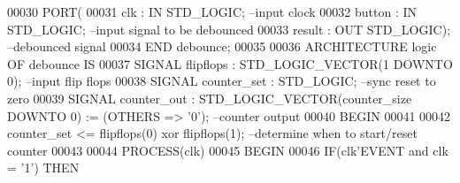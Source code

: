\begin{DoxyCode}
00030   \textcolor{keywordflow}{PORT}\textcolor{vhdlchar}{(}
00031     \textcolor{vhdlchar}{clk}     \textcolor{vhdlchar}{:} \textcolor{keywordflow}{IN}  \textcolor{comment}{STD\_LOGIC};\textcolor{keyword}{  --input clock}
00032     \textcolor{vhdlchar}{button}  \textcolor{vhdlchar}{:} \textcolor{keywordflow}{IN}  \textcolor{comment}{STD\_LOGIC};\textcolor{keyword}{  --input signal to be debounced}
00033     \textcolor{vhdlchar}{result}  \textcolor{vhdlchar}{:} \textcolor{keywordflow}{OUT} \textcolor{comment}{STD\_LOGIC}\textcolor{vhdlchar}{)};\textcolor{keyword}{ --debounced signal}
00034 \textcolor{keywordflow}{END} \textcolor{vhdlchar}{debounce};
00035 
00036 \textcolor{keywordflow}{ARCHITECTURE} logic \textcolor{keywordflow}{OF} debounce IS
00037   \textcolor{keywordflow}{SIGNAL} \textcolor{vhdlchar}{flipflops}   \textcolor{vhdlchar}{:} \textcolor{comment}{STD\_LOGIC\_VECTOR}\textcolor{vhdlchar}{(}\textcolor{vhdllogic}{}\textcolor{vhdllogic}{1} \textcolor{keywordflow}{DOWNTO} \textcolor{vhdllogic}{}\textcolor{vhdllogic}{0}\textcolor{vhdlchar}{)};\textcolor{keyword}{ --input flip flops}
00038   \textcolor{keywordflow}{SIGNAL} \textcolor{vhdlchar}{counter_set} \textcolor{vhdlchar}{:} \textcolor{comment}{STD\_LOGIC};\textcolor{keyword}{                    --sync reset to zero}
00039   \textcolor{keywordflow}{SIGNAL} \textcolor{vhdlchar}{counter_out} \textcolor{vhdlchar}{:} \textcolor{comment}{STD\_LOGIC\_VECTOR}\textcolor{vhdlchar}{(}\textcolor{vhdlchar}{counter_size} \textcolor{keywordflow}{DOWNTO} \textcolor{vhdllogic}{}\textcolor{vhdllogic}{0}\textcolor{vhdlchar}{)} \textcolor{vhdlchar}{:=} \textcolor{vhdlchar}{(}\textcolor{keywordflow}{OTHERS} \textcolor{vhdlchar}{=}\textcolor{vhdlchar}{>} \textcolor{vhdlchar}{'}\textcolor{vhdllogic}{}\textcolor{vhdllogic}{0}\textcolor{vhdlchar}{'}\textcolor{vhdlchar}{)};\textcolor{keyword}{ --counter output}
00040 \textcolor{vhdlkeyword}{BEGIN}
00041 
00042   \textcolor{vhdlchar}{counter_set} \textcolor{vhdlchar}{<=} \textcolor{vhdlchar}{flipflops}\textcolor{vhdlchar}{(}\textcolor{vhdllogic}{}\textcolor{vhdllogic}{0}\textcolor{vhdlchar}{)} \textcolor{keywordflow}{xor} \textcolor{vhdlchar}{flipflops}\textcolor{vhdlchar}{(}\textcolor{vhdllogic}{}\textcolor{vhdllogic}{1}\textcolor{vhdlchar}{)};\textcolor{keyword}{   --determine when to start/reset counter}
00043   
00044   \textcolor{keywordflow}{PROCESS}(clk)
00045 \textcolor{vhdlkeyword}{  BEGIN}
00046     \textcolor{keywordflow}{IF}\textcolor{vhdlchar}{(}\textcolor{vhdlchar}{clk}\textcolor{vhdlchar}{'}\textcolor{vhdlkeyword}{EVENT} \textcolor{keywordflow}{and} \textcolor{vhdlchar}{clk} \textcolor{vhdlchar}{=} \textcolor{vhdlchar}{'}\textcolor{vhdllogic}{}\textcolor{vhdllogic}{1}\textcolor{vhdlchar}{'}\textcolor{vhdlchar}{)} \textcolor{keywordflow}{THEN}

\end{DoxyCode}
